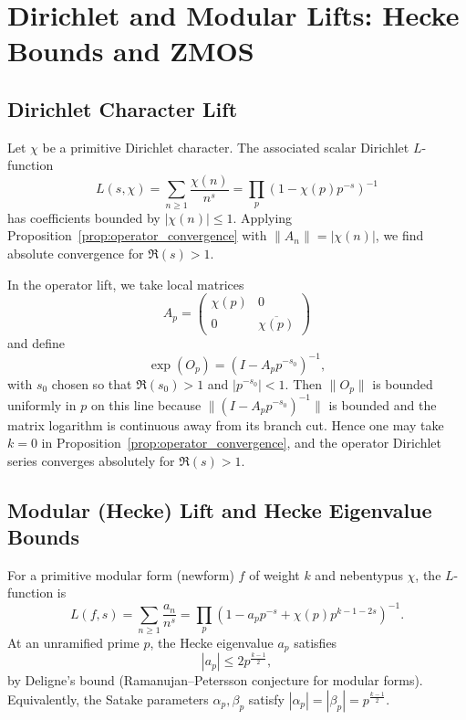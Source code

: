 \documentclass[11pt]{article}
\begin{document}
\section{Dirichlet and Modular Lifts: Hecke Bounds and ZMOS}

\subsection{Dirichlet Character Lift}

Let $\chi$ be a primitive Dirichlet character. The associated scalar
Dirichlet $L$-function
\[
  L(s,\chi) = \sum_{n\ge 1} \frac{\chi(n)}{n^s}
  = \prod_p (1-\chi(p)p^{-s})^{-1}
\]
has coefficients bounded by $|\chi(n)| \le 1$. Applying
Proposition~\ref{prop:operator_convergence} with $\|A_n\| = |\chi(n)|$,
we find absolute convergence for $\Re(s)>1$.

In the operator lift, we take local matrices
\[
  A_p = \begin{pmatrix}\chi(p)&0\\0&\overline{\chi(p)}\end{pmatrix}
\]
and define
\[
  \exp(O_p) = (I - A_p p^{-s_0})^{-1},
\]
with $s_0$ chosen so that $\Re(s_0)>1$ and $|p^{-s_0}|<1$. Then
$\|O_p\|$ is bounded uniformly in $p$ on this line because
$\|(I-A_p p^{-s_0})^{-1}\|$ is bounded and the matrix logarithm is
continuous away from its branch cut. Hence one may take $k=0$ in
Proposition~\ref{prop:operator_convergence}, and the operator Dirichlet
series converges absolutely for $\Re(s)>1$.

\subsection{Modular (Hecke) Lift and Hecke Eigenvalue Bounds}

For a primitive modular form (newform) $f$ of weight $k$ and nebentypus
$\chi$, the $L$-function is
\[
  L(f,s) = \sum_{n\ge 1} \frac{a_n}{n^s}
  = \prod_p (1 - a_p p^{-s} + \chi(p)p^{k-1-2s})^{-1}.
\]
At an unramified prime $p$, the Hecke eigenvalue $a_p$ satisfies
\[
  |a_p| \le 2 p^{\frac{k-1}{2}},
\]
by Deligne's bound (Ramanujan--Petersson conjecture for modular forms).
Equivalently, the Satake parameters $\alpha_p,\beta_p$ satisfy
$|\alpha_p|=|\beta_p|=p^{\frac{k-1}{2}}$.
\end{document}
